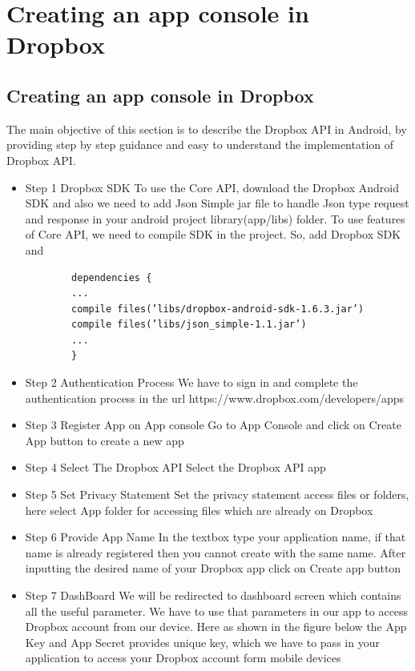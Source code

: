 \documentclass[12pt]{report}
\begin{document}
	\chapter{Creating an app console in Dropbox}
\section{Creating an app console in Dropbox}

The main objective of this section is to describe the Dropbox API in Android, by providing step by
step guidance and easy to understand the implementation of Dropbox API.

\begin{itemize}
\item Step 1 Dropbox SDK
To use the Core API, download the Dropbox Android SDK and also we need to add Json
Simple jar file to handle Json type request and response in your android project library(app/libs)
folder. To use features of Core API, we need to compile SDK in the project. So, add
Dropbox SDK
and

\begin{lstlisting}
        dependencies {
        ...
        compile files(’libs/dropbox-android-sdk-1.6.3.jar’)
        compile files(’libs/json_simple-1.1.jar’)
        ...
        }
\end{lstlisting}

\item Step 2 Authentication Process
We have to sign in and complete the authentication process in the url https://www.dropbox.com/developers/apps

\item Step 3 Register App on App console
Go to App Console and click on Create App button to create a new app

\item Step 4 Select The Dropbox API
Select the Dropbox API app

\item Step 5 Set Privacy Statement
Set the privacy statement access files or folders, here select App folder for accessing files which
are already on Dropbox

\item Step 6 Provide App Name
In the textbox type your application name, if that name is already registered then you cannot
create with the same name. After inputting the desired name of your Dropbox app click on
Create app button

\item Step 7 DashBoard
We will be redirected to dashboard screen which contains all the useful parameter. We have
to use that parameters in our app to access Dropbox account from our device. Here as shown
in the figure below the App Key and App Secret provides unique key, which we have to pass
in your application to access your Dropbox account form mobile devices


\end{itemize}
\end{document}
